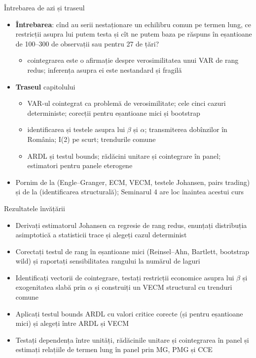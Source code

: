 \begin{frame}{Întrebarea de azi și traseul}
\itemsize{\small}
\begin{itemize}
    \item \textbf{Întrebarea}: cînd au serii nestaționare un echilibru comun pe termen lung, ce restricții asupra lui putem testa și cît ne putem baza pe răspuns în eșantioane de 100--300 de observații sau pentru 27 de țări?
    \begin{itemize}
        \item cointegrarea este o afirmație despre verosimilitatea unui VAR de rang redus; inferența asupra ei este nestandard și fragilă
    \end{itemize}
    \item \textbf{Traseul} capitolului
    \begin{itemize}
        \item VAR-ul cointegrat ca problemă de verosimilitate; cele cinci cazuri deterministe; corecții pentru eșantioane mici și bootstrap
        \item identificarea și testele asupra lui $\beta$ și $\alpha$; transmiterea dobînzilor în România; I(2) pe scurt; trendurile comune
        \item ARDL și testul bounds; rădăcini unitare și cointegrare în panel; estimatori pentru panele eterogene
    \end{itemize}
    \item Pornim de la  (Engle--Granger, ECM, VECM, testele Johansen, pairs trading) și de la  (identificarea structurală); Seminarul 4 are loc înaintea acestui curs
\end{itemize}
\end{frame}

\begin{frame}{Rezultatele învățării}
\itemsize{\small}
\begin{itemize}
    \item Derivați estimatorul Johansen ca regresie de rang redus, enunțați distribuția asimptotică a statisticii trace și alegeți cazul determinist
    \item Corectați testul de rang în eșantioane mici (Reinsel--Ahn, Bartlett, bootstrap wild) și raportați sensibilitatea rangului la numărul de laguri
    \item Identificați vectorii de cointegrare, testați restricții economice asupra lui $\beta$ și exogenitatea slabă prin $\alpha$ și construiți un VECM structural cu trenduri comune
    \item Aplicați testul bounds ARDL cu valori critice corecte (și pentru eșantioane mici) și alegeți între ARDL și VECM
    \item Testați dependența între unități, rădăcinile unitare și cointegrarea în panel și estimați relațiile de termen lung în panel prin MG, PMG și CCE
\end{itemize}
\end{frame}

